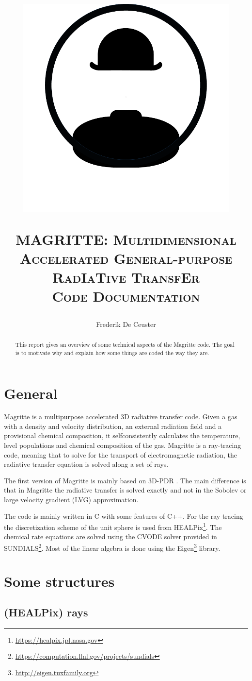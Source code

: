 \documentclass[]{article}
\title{
  \begin{figure}[H]
	   \centering
	   \includegraphics[scale=.3]{Images/Magritte_logo_v2_BW.pdf}
  \end{figure}
  \vskip-3mm
  \textsc{\Large MAGRITTE: Multidimensional Accelerated General-purpose RadIaTive TransfEr}   \\
  \vskip13mm
  \textsc{\Huge Code Documentation}
}
\author{\Large \vskip13mm Frederik De Ceuster}
\date{}
\begin{document}
\maketitle

\vskip13mm

\begin{abstract}
This report gives an overview of some technical aspects of the Magritte code. The goal is to motivate why and explain how some things are coded the way they are.
\end{abstract}


\newpage

\tableofcontents


\newpage


\section{General}

Magritte is a multipurpose accelerated 3D radiative transfer code. Given a gas with a density and velocity distribution, an external radiation field and a provisional chemical composition, it selfconsistently calculates the temperature, level populations and chemical composition of the gas. Magritte is a ray-tracing code, meaning that to solve for the transport of electromagnetic radiation, the radiative transfer equation is solved along a set of rays.

\bigskip

The first version of Magritte is mainly based on 3D-PDR \cite{3DPDR}. The main difference is that in Magritte the radiative transfer is solved exactly and not in the Sobolev or large velocity gradient (LVG) approximation.

\bigskip

The code is mainly written in C with some features of C++. For the ray tracing the discretization scheme of the unit sphere is used from HEALPix\footnote{\url{https://healpix.jpl.nasa.gov}}. The chemical rate equations are solved using the CVODE solver provided in SUNDIALS\footnote{\url{https://computation.llnl.gov/projects/sundials}}. Most of the linear algebra is done using the Eigen\footnote{\url{http://eigen.tuxfamily.org}} library.



\section{Some structures}

\subsection{(HEALPix) rays}
\end{document}
